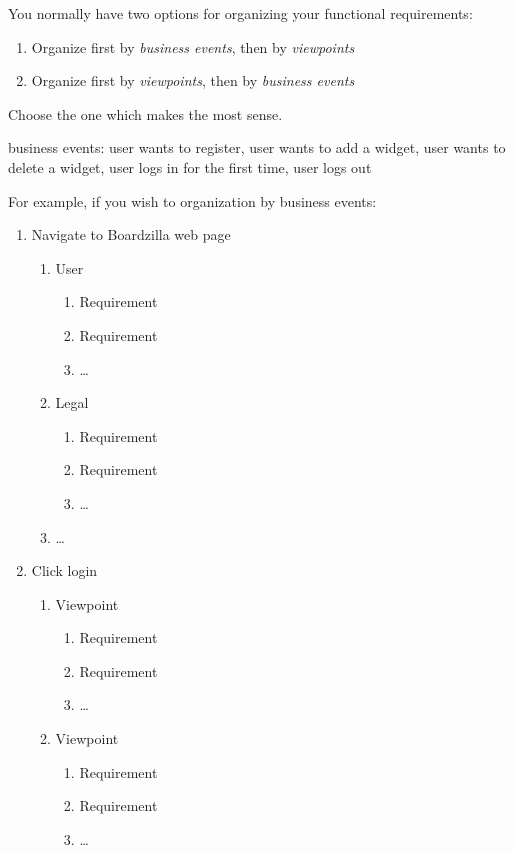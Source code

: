 \documentclass[]{article}
\begin{document}
You normally have two options for organizing your functional requirements:
\begin{enumerate}
	\item Organize first by \emph{business events}, then by \emph{viewpoints}
	\item Organize first by \emph{viewpoints}, then by \emph{business events}
\end{enumerate}
Choose the one which makes the most sense.

business events: user wants to register, user wants to add a widget, user wants to delete a widget, user logs in for the first time, user logs out

For example, if you wish to organization by business events:
\begin{enumerate}[{BE}1.]
	\item Navigate to Boardzilla web page
	\begin{enumerate}[{VP1}.1]
		\item User
			\begin{enumerate}
				\item Requirement
				\item Requirement
				\item \dots
			\end{enumerate}
		\item Legal
			\begin{enumerate}
				\item Requirement
				\item Requirement
				\item \dots
			\end{enumerate}
		\item \dots
	\end{enumerate}
	\item Click login
	\begin{enumerate}[{VP2}.1]
		\item Viewpoint
			\begin{enumerate}
				\item Requirement
				\item Requirement
				\item \dots
			\end{enumerate}
		\item Viewpoint
			\begin{enumerate}
				\item Requirement
				\item Requirement
				\item \dots
			\end{enumerate}

\end{enumerate}
\end{enumerate}
\end{document}
